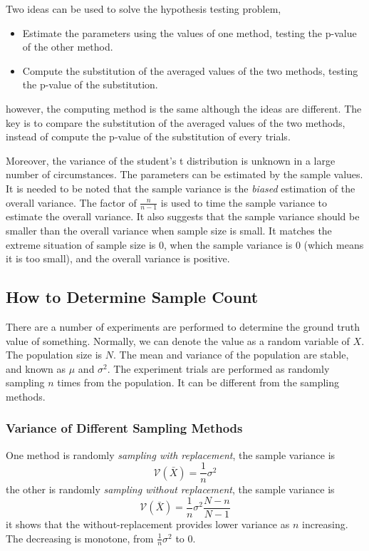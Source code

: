 Two ideas can be used to solve the hypothesis testing problem,
\begin{itemize}
    \item Estimate the parameters using the values of one method, testing the p-value of the other method.
    \item Compute the substitution of the averaged values of the two methods, testing the p-value of the substitution.
\end{itemize}
however, the computing method is the same although the ideas are different.
The key is to compare the substitution of the averaged values of the two methods,
instead of compute the p-value of the substitution of every trials.

Moreover, the variance of the student's t distribution is unknown in a large number of circumstances.
The parameters can be estimated by the sample values.
It is needed to be noted that the sample variance is the \emph{biased} estimation of the overall variance.
The factor of $\frac{n}{n-1}$ is used to time the sample variance to estimate the overall variance.
It also suggests that the sample variance should be smaller than the overall variance when sample size is small.
It matches the extreme situation of sample size is $0$,
when the sample variance is $0$ (which means it is too small), and the overall variance is positive.

\subsection{How to Determine Sample Count}

There are a number of experiments are performed to determine the ground truth value of something.
Normally, we can denote the value as a random variable of $X$.
The population size is $N$.
The mean and variance of the population are stable, and known as $\mu$ and $\sigma^2$.
The experiment trials are performed as randomly sampling $n$ times from the population.
It can be different from the sampling methods.

\subsubsection{Variance of Different Sampling Methods}

One method is randomly \emph{sampling with replacement},
the sample variance is
\begin{equation}
    \label{Equation: Variance of Sample Variance on With-Replacement Sampling}
    \mathcal{V}(\bar{X}) = \frac{1}{n} \sigma^2
\end{equation}
the other is randomly \emph{sampling without replacement},
the sample variance is
\begin{equation}
    \label{Equation: Variance of Sample Variance on Without-Replacement Sampling}
    \mathcal{V}(\bar{X})  = \frac{1}{n} \sigma^2 \frac{N-n}{N-1}
\end{equation}
it shows that the without-replacement provides lower variance as $n$ increasing.
The decreasing is monotone, from $\frac{1}{n} \sigma^2$ to $0$.

